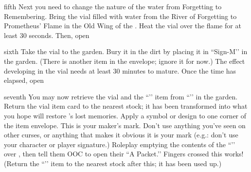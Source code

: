 \documentclass[notebook]{GL2020} %
\begin{document}
\begin{page}{fifth}
Next you need to change the nature of the water from Forgetting to Remembering. Bring the vial filled with water from the River of Forgetting to Prometheus’ Flame in the Old Wing of the \pSc{}. Heat the vial over the flame for at least 30 seconds. Then, open 
\end{page}

\begin{page}{sixth}
Take the vial to the garden. Bury it in the dirt by placing it in ``Sign-M’’ in the garden. (There is another item in the envelope; ignore it for now.) The effect developing in the vial needs at least 30 minutes to mature. Once the time has elapsed, open 
\end{page}

\begin{page}{seventh}
You may now retrieve the vial and the ``\iMemoryCure{}’’ item from ``\sSignM{}’’ in the garden. Return the vial item card to the nearest stock; it has been transformed into what you hope will restore \cDisney{}’s lost memories. Apply a symbol or design to one corner of the item envelope. This is your maker’s mark. Don’t use anything you’ve seen on other curses, or anything that makes it obvious it is your mark (e.g.: don’t use your character or player signature.) Roleplay emptying the contents of the ``\iMemoryCure{}’’ over \cDisney{}, then tell them OOC to open their ``A Packet.’’ Fingers crossed this works! (Return the ``\iMemoryCure{}’’ item to the nearest stock after this; it has been used up.)

\end{page}

\endnotebook
\end{document}
